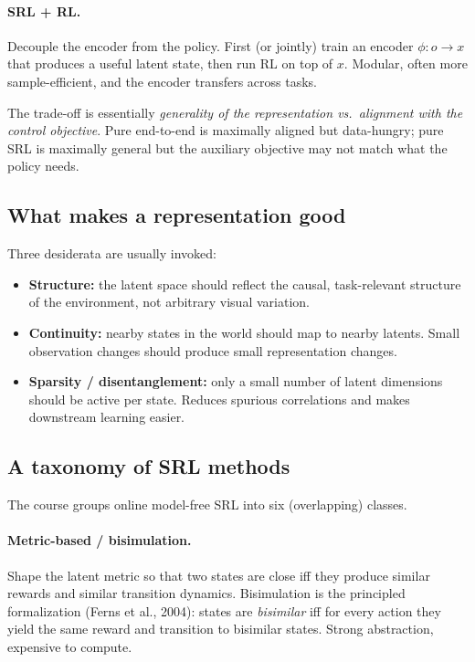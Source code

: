 \documentclass[11pt, oneside]{book}
\begin{document}
\paragraph{SRL + RL.}
Decouple the encoder from the policy. First (or jointly) train an encoder
$\phi: o \to x$ that produces a useful latent state, then run RL on top of $x$.
Modular, often more sample-efficient, and the encoder transfers across tasks.

The trade-off is essentially \emph{generality of the representation vs.\ alignment with the
control objective}. Pure end-to-end is maximally aligned but data-hungry; pure SRL is
maximally general but the auxiliary objective may not match what the policy needs.

\subsection{What makes a representation good}

Three desiderata are usually invoked:
\begin{itemize}
  \item \textbf{Structure:} the latent space should reflect the causal, task-relevant
    structure of the environment, not arbitrary visual variation.
  \item \textbf{Continuity:} nearby states in the world should map to nearby latents.
    Small observation changes should produce small representation changes.
  \item \textbf{Sparsity / disentanglement:} only a small number of latent dimensions
    should be active per state. Reduces spurious correlations and makes downstream
    learning easier.
\end{itemize}

\subsection{A taxonomy of SRL methods}

The course groups online model-free SRL into six (overlapping) classes.

\paragraph{Metric-based / bisimulation.}
Shape the latent metric so that two states are close iff they produce similar rewards
and similar transition dynamics. Bisimulation is the principled formalization
(Ferns et al., 2004): states are \emph{bisimilar} iff for every action they yield the
same reward and transition to bisimilar states. Strong abstraction, expensive to compute.
\end{document}
